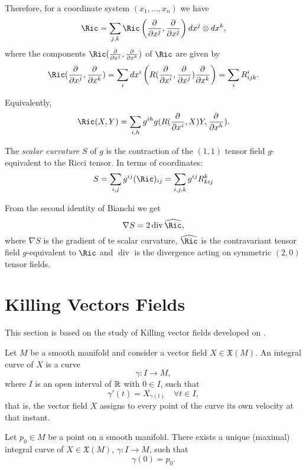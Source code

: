Therefore, for a coordinate system $(x_1, \dots, x_n)$ we have
\[
	\Ric = \sum_{j,k} \Ric\left( \pd{}{x^j},\pd{}{x^j}  \right) dx^j \otimes dx^k,
\]
where the components $\Ric(\pd{}{x^j}, \pd{}{x^k})$ of $\Ric$ are given by
\[
	\Ric(\pd{}{x^j}, \pd{}{x^k}) = \sum_i dx^i \left( R(\pd{}{x^i}, \pd{}{x^j})\pd{}{x^k} \right) = \sum_i R^i_{ijk}.
\]

Equivalently,
\[
	\Ric(X,Y)  = \sum_{i,h} g^{ih} g(R(\pd{}{x^i}, X)Y, \pd{}{x^h}).
\]

\begin{definition}
	\label{def:scalarcurvature}
	The \emph{scalar curvature} $S$ of $g$ is the contraction of the $(1,1)$ tensor field $g$-equivalent to the Ricci tensor. In terms of coordinates:
	\[
		S = \sum_{i,j} g^{ij}(\Ric)_{ij} = \sum_{i,j,k} g^{ij} R^k_{kij}
	\]
\end{definition}

From the second identity of Bianchi we get \cite[p. 88]{oneill83}
\[
	\nabla S = 2 \operatorname{div} \widehat{\Ric},
\]
where $\nabla S$ is the gradient of te scalar curvature, $\widehat{\Ric}$ is the contravariant tensor field $g$-equivalent to $\Ric$ and $\operatorname{div}$ is the divergence acting on symmetric $(2,0)$ tensor fields.

\section{Killing Vectors Fields}

This section is based on the study of Killing vector fields developed on \cite[pp. 250-252]{oneill83}.

\begin{definition}
	Let $M$ be a smooth manifold and consider a vector field $X \in \mathfrak{X}(M)$.
	An integral curve of $X$ is a curve
	\[
		\gamma \colon I \to M,
	\]
	where $I$ is an open interval of $\mathbb{R}$ with $0 \in I$, such that
	\begin{equation}
		\label{eq:integralcurve}
		\gamma'(t) = X_{\gamma(t)} \quad \forall t \in I,
	\end{equation}
	that is, the vector field $X$ assigns to every point of the curve its own velocity at that instant.
\end{definition}

\begin{lemma}
	Let $p_0 \in M$ be a point on a smooth manifold. There exists a unique (maximal) integral curve of $X\in\mathfrak{X}(M)$, $\gamma \colon I \to M$, such that
	\begin{equation}
		\label{eq:initcond}
		\gamma(0) = p_0.
	\end{equation}
\end{lemma}

